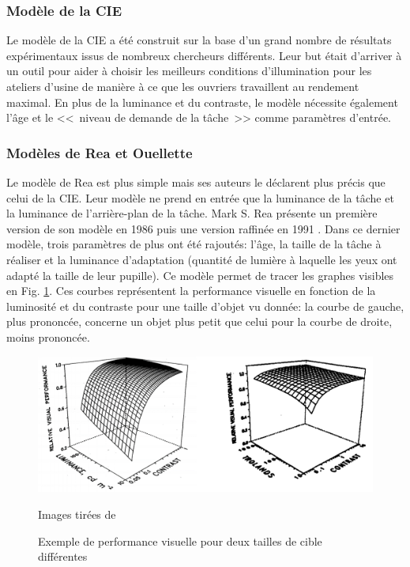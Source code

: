 	\subsubsection{Modèle de la CIE}
	\par Le modèle de la CIE a été construit sur la base d'un grand nombre de résultats expérimentaux issus de nombreux chercheurs différents. Leur but était d'arriver à un outil pour aider à choisir les meilleurs conditions d'illumination pour les ateliers d'usine de manière à ce que les ouvriers travaillent au rendement maximal. En plus de la luminance et du contraste, le modèle nécessite également l'âge et le <<~niveau de demande de la tâche~>> comme paramètres d'entrée.
	
	\subsubsection{Modèles de Rea et Ouellette}
	\par Le modèle de Rea est plus simple mais ses auteurs le déclarent plus précis que celui de la CIE. Leur modèle ne prend en entrée que la luminance de la tâche et la luminance de l'arrière-plan de la tâche. Mark S. Rea présente un première version de son modèle en 1986 \citep{rea_toward_1986} puis une version raffinée en 1991 \citep{rea_relative_1991}. Dans ce dernier modèle, trois paramètres de plus ont été rajoutés: l'âge, la taille de la tâche à réaliser et la luminance d'adaptation (quantité de lumière à laquelle les yeux ont adapté la taille de leur pupille). Ce modèle permet de tracer les graphes visibles en Fig. \ref{fig:courbes_rea}. Ces courbes représentent la performance visuelle en fonction de la luminosité et du contraste pour une taille d'objet vu donnée: la courbe de gauche, plus prononcée, concerne un objet plus petit que celui pour la courbe de droite, moins prononcée.
	
	\begin{figure}
		\centering
		\includegraphics[scale=.5]{Figures/CourbesReaExemple}
		\caption{Exemple de performance visuelle pour deux tailles de cible différentes}{Images tirées de \citep{rea_relative_1991}}
		\label{fig:courbes_rea}
	\end{figure}
	
